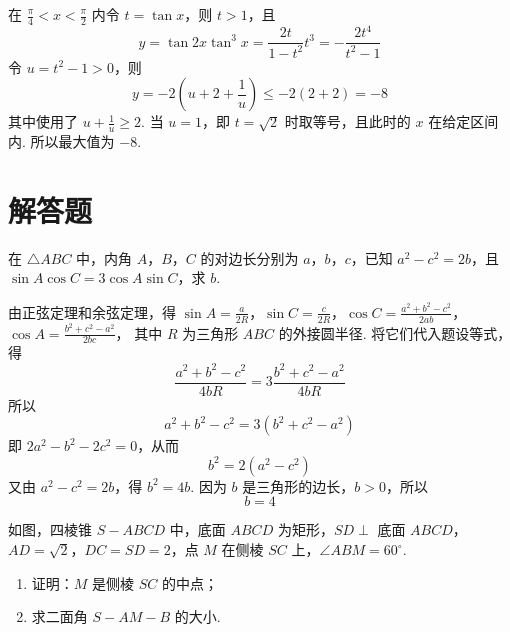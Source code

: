 \begin{solution}
在 \(\frac{\pi}{4}<x<\frac{\pi}{2}\) 内令 \(t=\tan x\)，则 \(t>1\)，且
\[
y=\tan2x\tan^3x=\frac{2t}{1-t^2}t^3=-\frac{2t^4}{t^2-1}
\]
令 \(u=t^2-1>0\)，则
\[
y=-2\left(u+2+\frac1u\right)\leqslant-2(2+2)=-8
\]
其中使用了 \(u+\frac1u\geqslant2\). 当 \(u=1\)，即 \(t=\sqrt2\) 时取等号，且此时的 \(x\) 在给定区间内. 所以最大值为 \(-8\).
\end{solution}

\section{解答题}

\begin{problem}
在 \(\triangle ABC\) 中，内角 \(A\)，\(B\)，\(C\) 的对边长分别为 \(a\)，\(b\)，\(c\)，已知 \(a^2 - c^2 = 2b\)，且 \(\sin A \cos C = 3 \cos A \sin C\)，求 \(b\).
\end{problem}

\begin{solution}
由正弦定理和余弦定理，得 \(\sin A=\frac{a}{2R}\)，\(\sin C=\frac{c}{2R}\)，\(\cos C=\frac{a^2+b^2-c^2}{2ab}\)，\(\cos A=\frac{b^2+c^2-a^2}{2bc}\)，
其中 \(R\) 为三角形 \(ABC\) 的外接圆半径. 将它们代入题设等式，得
\[
\frac{a^2+b^2-c^2}{4bR}
=3\frac{b^2+c^2-a^2}{4bR}
\]
所以
\[
a^2+b^2-c^2=3\left(b^2+c^2-a^2\right)
\]
即 \(2a^2-b^2-2c^2=0\)，从而
\[
b^2=2\left(a^2-c^2\right)
\]
又由 \(a^2-c^2=2b\)，得 \(b^2=4b\). 因为 \(b\) 是三角形的边长，\(b>0\)，所以
\[
b=4
\]
\end{solution}

\begin{problem}
如图，四棱锥 \(S - ABCD\) 中，底面 \(ABCD\) 为矩形，\(SD \perp\) 底面 \(ABCD\)，\(AD = \sqrt{2}\)，\(DC = SD = 2\)，点 \(M\) 在侧棱 \(SC\) 上，\(\angle ABM = 60^\circ\).

\begin{enumerate}
\item 证明：\(M\) 是侧棱 \(SC\) 的中点；
\item 求二面角 \(S - AM - B\) 的大小.
\end{enumerate}

\end{problem}


